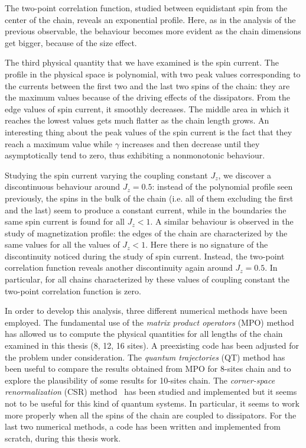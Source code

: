 \documentclass[12pt]{extarticle}
\begin{document}
The two-point correlation function, studied between equidistant spin from the center of the chain, reveals an exponential profile. Here, as in the analysis of the previous observable, the behaviour becomes more evident as the chain dimensions get bigger, because of the size effect.

The third physical quantity that we have examined is the spin current. The profile in the physical space is polynomial, with two peak values corresponding to the currents between the first two and the last two spins of the chain: they are the maximum values because of the driving effects of the dissipators. From the edge values of spin current, it smoothly decreases. The middle area in which it reaches the lowest values gets much flatter as the chain length grows. An interesting thing about the peak values of the spin current is the fact that they reach a maximum value while $\gamma$ increases and then decrease until they  asymptotically tend to zero, thus exhibiting a nonmonotonic behaviour.

Studying the spin current varying the coupling constant $J_z$, we discover a discontinuous behaviour around $J_z = 0.5$: instead of the polynomial profile seen previously, %
the spins in the bulk of the chain (i.e. all of them excluding the first and the last) seem to produce a constant current, while in the boundaries the same spin current is found for all $J_z < 1$. A similar behaviour is observed in the study of magnetization profile: the edges of the chain are characterized by the same values for all the values of $J_z < 1$. Here there is no signature of the discontinuity noticed during the study of spin current. Instead, the two-point correlation function reveals another discontinuity again around $J_z = 0.5$. In particular, for all chains characterized by these values of coupling constant the two-point correlation function is zero.

In order to develop this analysis, three different numerical methods have been employed.  The fundamental use of the \emph{matrix product operators} (MPO) method\cite{mpo_method} has allowed us to compute the physical quantities for all lengths of the chain examined in this thesis (8, 12, 16 sites). A preexisting code has been adjusted for the problem under consideration. The \emph{quantum trajectories} (QT) method\cite{QT_method} has been useful to compare the results obtained from MPO for 8-sites chain and to explore the plausibility of some results for 10-sites chain. The \emph{corner-space renormalization} (CSR) method~\cite{CSR_method} has been studied and implemented but it seems not to be useful for this kind of quantum systems. In particular, it seems to work more properly when all the spins of the chain are coupled to dissipators. For the last two numerical methods, a code has been written and implemented from scratch, during this thesis work.
\end{document}
